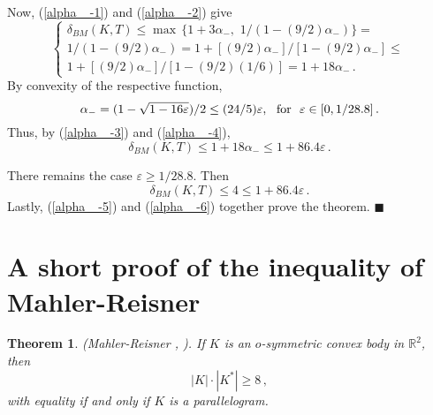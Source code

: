 \documentclass[12pt]{article}
\newtheorem{Thm}{Theorem}
\newcommand{\R}{\mathbb{R}}
\begin{document}
Now, (\ref{alpha _-1}) and (\ref{alpha _-2}) give
\begin{equation}
\label{alpha _-3}
\begin{cases}
\delta _{BM} (K,T) \le  \max \, 
\{ 1+3 \alpha _-, \,\, 1/(1-(9/2) \alpha _-) \} =
\\
1/(1-(9/2) \alpha _-) = 
1+[(9/2) \alpha _- ]/[1-(9/2) \alpha _-]  \le \\
1+[(9/2) \alpha _- ]/[1-(9/2) (1/6)] =1+18 \alpha _- \,.
\end{cases}
\end{equation}
By convexity of the respective function,
\begin{equation}
\label{alpha _-4}
\alpha _- = (1-\sqrt{1-16 \varepsilon})/2 \le (24/5) \varepsilon , 
{\text{\,\,\,\,for\,\,\,\,}} \varepsilon \in [0, 1/28.8]\,.
\end{equation}
Thus, by (\ref{alpha _-3}) and (\ref{alpha _-4}),
\begin{equation}
\label{alpha _-5}
\delta _{BM}(K,T) \le 1+18 \alpha _- \le 1+86.4 \varepsilon \,.
\end{equation}
 
There remains the case $\varepsilon \ge 1/28.8$.
Then
\begin{equation}
\label{alpha _-6}
\delta _{BM}(K,T) \le 4 \le 1+86.4 \varepsilon \,.
\end{equation}
Lastly, (\ref{alpha _-5}) and (\ref{alpha _-6}) together prove the theorem.
$ \blacksquare $






\section{A short proof of the inequality of Mahler-Reisner} 

\begin{Thm}
\label{MahlerReisner} (Mahler-Reisner {\rm{\cite{Mah38}, \cite{R86}}}).
If $K$ is an $o$-symmetric convex body in $\R^2$, then
$$
|K|\cdot|K^*| \ge 8\,,
$$
with equality if and only if $K$ is a parallelogram.
\end{Thm}

\end{document}
